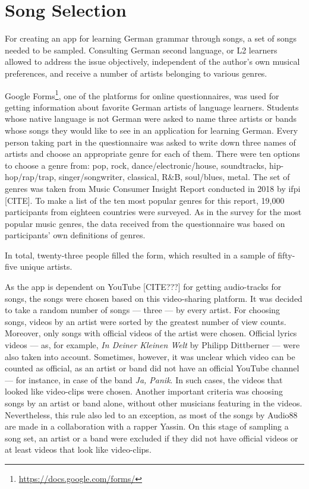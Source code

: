 \chapter{Song Selection}
\label{sec:selection}

For creating an app for learning German grammar through songs, a set of songs needed to be sampled. Consulting German second language, or L2 learners allowed to address the issue objectively, independent of the author's own musical preferences, and receive a number of artists belonging to various genres.

Google Forms\footnote{\url{https://docs.google.com/forms/}}, one of the platforms for online questionnaires, was used for getting information about favorite German artists of language learners. Students whose native language is not German were asked to name three artists or bands whose songs they would like to see in an application for learning German. Every person taking part in the questionnaire was asked to write down three names of artists and choose an appropriate genre for each of them. There were ten options to choose a genre from: pop, rock, dance/electronic/house, soundtracks, hip-hop/rap/trap, singer/songwriter, classical, R\&B, soul/blues, metal. The set of genres was taken from Music Consumer Insight Report conducted in 2018 by ifpi [CITE]. To make a list of the ten most popular genres for this report, 19,000 participants from eighteen countries were surveyed. As in the survey for the most popular music genres, the data received from the questionnaire was based on participants' own definitions of genres.

In total, twenty-three people filled the form, which resulted in a sample of fifty-five unique artists.

As the app is dependent on YouTube [CITE???] for getting audio-tracks for songs, the songs were chosen based on this video-sharing platform. It was decided to take a random number of songs --- three --- by every artist. For choosing songs, videos by an artist were sorted by the greatest number of view counts. Moreover, only songs with official videos of the artist were chosen. Official lyrics videos --- as, for example, \textit{In Deiner Kleinen Welt} by Philipp Dittberner --- were also taken into account. Sometimes, however, it was unclear which video can be counted as official, as an artist or band did not have an official YouTube channel --- for instance, in case of the band \textit{Ja, Panik}. In such cases, the videos that looked like video-clips were chosen. Another important criteria was choosing songs by an artist or band alone, without other musicians featuring in the videos. Nevertheless, this rule also led to an exception, as most of the songs by Audio88 are made in a collaboration with a rapper Yassin. On this stage of sampling a song set, an artist or a band were excluded if they did not have official videos or at least videos that look like video-clips.

